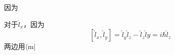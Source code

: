 因为

对于$\hat{l}_x$，因为
$$
\left[ \hat{l}_x,\hat{l}_y \right]=\hat{l}_y\hat{l}_z-\hat{l}_z\hat{l}y =i\hbar \hat{l}_z
$$
两边用$\langle$m|